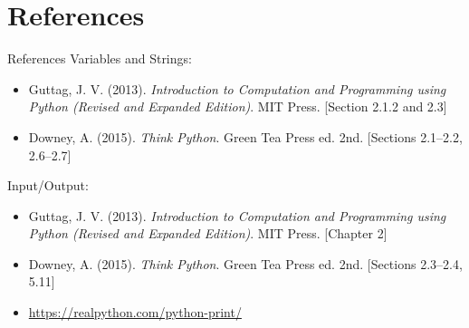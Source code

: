 \documentclass[t,handout,9pt]{beamer}
\begin{document}
\section{References}
\begin{frame}{References}
	Variables and Strings:
\begin{itemize}
	\item Guttag, J. V. (2013). \textit{Introduction to Computation and Programming using Python (Revised and Expanded Edition)}. MIT Press. [Section 2.1.2 and 2.3]
	\item Downey, A. (2015). \textit{Think Python}. Green Tea Press ed. 2nd. [Sections 2.1--2.2, 2.6--2.7]
\end{itemize}
Input/Output:
\begin{itemize}
	\item Guttag, J. V. (2013). \textit{Introduction to Computation and Programming using Python (Revised and Expanded Edition)}. MIT Press. [Chapter 2]
	\item Downey, A. (2015). \textit{Think Python}. Green Tea Press ed. 2nd. [Sections 2.3--2.4, 5.11]
	\item \url{https://realpython.com/python-print/}
\end{itemize}
\end{frame}
\end{document}
